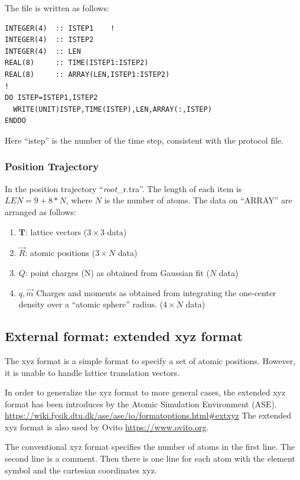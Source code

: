 \documentclass[final,12pt,makeidx,DIV=calc]{article}
\begin{document}
{{{The file is written as follows:
\begin{verbatim}
INTEGER(4)  :: ISTEP1    !
INTEGER(4)  :: ISTEP2
INTEGER(4)  :: LEN
REAL(8)     :: TIME(ISTEP1:ISTEP2)
REAL(8)     :: ARRAY(LEN,ISTEP1:ISTEP2)
!
DO ISTEP=ISTEP1,ISTEP2
  WRITE(UNIT)ISTEP,TIME(ISTEP),LEN,ARRAY(:,ISTEP)
ENDDO
\end{verbatim}

Here ``istep'' is the number of the time step, consistent with the
protocol file. 

\subsubsection{Position Trajectory}
In the position trajectory ``{\it root}\_r.tra''. The length of each
item is $LEN=9+8*N$, where $N$ is the number of atoms. The data on
``ARRAY'' are arranged as follows:
\begin{enumerate}
\item $\mathbf{T}$: lattice vectors ($3\times3$ data)
\item $\vec{R}$: atomic positions ($3\times N$ data)
\item $Q$: point charges (N) as obtained from Gaussian fit ($N$ data)
\item $q,\vec{m}$ Charges and moments as obtained from integrating the
  one-center density over a ``atomic sphere'' radius. ($4\times N$ data)
\end{enumerate}


\subsection{External format: extended xyz format}
The xyz format is a simple format to specify a set of atomic
positions. However, it is unable to handle lattice translation
vectors.

In order to generalize the xyz format to more general cases, the
extended xyz format has been introduces by the Atomic Simulation
Environment
(ASE). \url{https://wiki.fysik.dtu.dk/ase/ase/io/formatoptions.html#extxyz}
The extended xyz format is also used by Ovito
\url{https://www.ovito.org}.

The conventional xyz format specifies the number of atoms in the first
line. The second line is a comment. Then there is one line for each
atom with the element symbol and the cartesian coordinates xyz.


}}}
\end{document}
